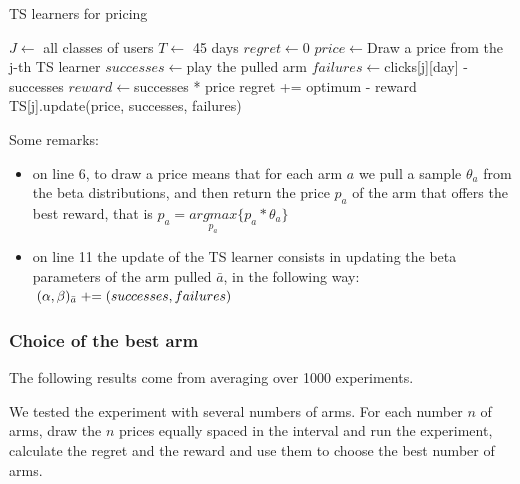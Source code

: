 \begin{algorithm}
    \caption{TS learners for pricing}
    \label{alg:ts_pricing}
	\begin{algorithmic}[1]
        \STATE $J\gets ${ all classes of users}
        \STATE $T\gets ${ 45 days }
        \STATE $regret\gets ${0}
		\STATE $price\gets ${Draw a price from the j-th TS learner}
        \STATE $successes\gets ${play the pulled arm}
        \STATE $failures\gets ${clicks[j][day] - successes}
        \STATE $reward\gets ${successes * price}
        \STATE regret += optimum - reward
        \STATE TS[j].update(price, successes, failures)
        \ENDFOR
        \ENDFOR
	\end{algorithmic}
\end{algorithm}

Some remarks:
\begin{itemize}
    \item on line 6, to draw a price means that for each arm $a$ we pull a sample $\theta_a$ from the beta distributions, and then return the price $p_a$ of the arm that offers the best reward, that is $p_a = \underset{p_a}{argmax} \{p_a * \theta_a\}$
    \item on line 11 the update of the TS learner consists in updating the beta parameters of the arm pulled $\bar{a}$, in the following way: $(\alpha, \beta)_{\bar{a}} \mathrel{+}= (successes, failures)$
\end{itemize}

\subsubsection{Choice of the best arm}
The following results come from averaging over 1000 experiments.

We tested the experiment with several numbers of arms. For each number $n$ of arms, draw the $n$ prices equally spaced in the interval and run the experiment, calculate the regret and the reward and use them to choose the best number of arms.


